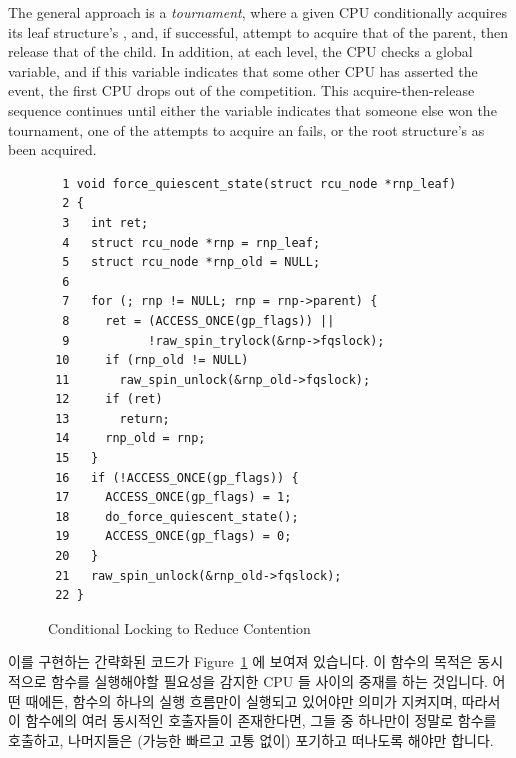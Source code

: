The general approach is a \emph{tournament}, where
a given CPU conditionally acquires its
leaf  structure's , and, if successful,
attempt to acquire that of the parent, then release that of the child.
In addition, at each level, the CPU checks a global 
variable, and if this variable indicates that some other CPU has
asserted the event, the first CPU drops out of the competition.
This acquire-then-release sequence continues until either the
 variable indicates that someone else won the tournament,
one of the attempts to acquire an  fails, or
the root  structure's  as been acquired.
\fi

\begin{figure}[tbp]
{ \scriptsize
\begin{verbatim}
  1 void force_quiescent_state(struct rcu_node *rnp_leaf)
  2 {
  3   int ret;
  4   struct rcu_node *rnp = rnp_leaf;
  5   struct rcu_node *rnp_old = NULL;
  6 
  7   for (; rnp != NULL; rnp = rnp->parent) {
  8     ret = (ACCESS_ONCE(gp_flags)) ||
  9           !raw_spin_trylock(&rnp->fqslock);
 10     if (rnp_old != NULL)
 11       raw_spin_unlock(&rnp_old->fqslock);
 12     if (ret)
 13       return;
 14     rnp_old = rnp;
 15   }
 16   if (!ACCESS_ONCE(gp_flags)) {
 17     ACCESS_ONCE(gp_flags) = 1;
 18     do_force_quiescent_state();
 19     ACCESS_ONCE(gp_flags) = 0;
 20   }
 21   raw_spin_unlock(&rnp_old->fqslock);
 22 }
\end{verbatim}
}
\caption{Conditional Locking to Reduce Contention}
\label{fig:locking:Conditional Locking to Reduce Contention}
\end{figure}

이를 구현하는 간략화된 코드가
Figure~\ref{fig:locking:Conditional Locking to Reduce Contention} 에 보여져
있습니다.
이 함수의 목적은 동시적으로  함수를 실행해야할
필요성을 감지한 CPU 들 사이의 중재를 하는 것입니다.
어떤 때에든,  함수의 하나의 실행 흐름만이
실행되고 있어야만 의미가 지켜지며, 따라서 이 함수에의 여러 동시적인 호출자들이
존재한다면, 그들 중 하나만이 정말로  함수를
호출하고, 나머지들은 (가능한 빠르고 고통 없이) 포기하고 떠나도록 해야만 합니다.


